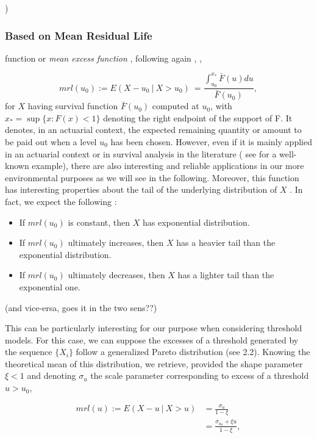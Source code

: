 \documentclass[11pt,a4paper,openany ]{book}
\begin{document}
)

\subsubsection*{Based on Mean Residual Life} function or \emph{mean excess function} 
, following again \cite[pp.14-19]{beirlant_statistics_2006}, \cite[pp.78-80]{coles_introduction_2001},

\begin{equation}
mrl(u_0)
:=E(X-u_0\ |\ X>u_0) 
\ = \frac{\int_{u_0}^{x_*} \bar{F}(u)du}{\bar{F}(u_0)},
\end{equation}
for $X$ having survival function $\bar{F}(u_0)$ computed at $u_0$, with $x_*=\sup\{ x:F(x)<1\}$ denoting the right endpoint of the support of F. 
It denotes, in an actuarial context, the expected remaining quantity or amount to be paid out when a level $u_0$ has been chosen. However, even if it is mainly applied in an actuarial context or in survival analysis in the literature ( see \cite{guess_mean_1988} for a well-known example), there are also interesting and reliable applications in our more environmental purposes as we will see in the following.
Moreover, this function has interesting properties about the tail of the underlying distribution of $X$ \cite[pp.16]{beirlant_statistics_2006}. In fact, we expect the following :

\begin{itemize}
	\item If $mrl(u_0)$ is constant, then $X$ has exponential distribution.
	\item If $mrl(u_0)$ ultimately increases, then $X$ has a heavier tail than the exponential distribution.
	\item If $mrl(u_0)$ ultimately decreases, then $X$ has a lighter tail than the exponential one.
\end{itemize} (and vice-ersa, goes it in the two sens??)

This can be particularly interesting for our purpose when considering threshold models. For this case, we can suppose the excesses of a threshold generated by the sequence $\{X_i\}$ follow a generalized Pareto distribution (see 2.2). Knowing the theoretical mean of this distribution, we retrieve, provided the shape parameter $\xi<1$ and denoting $\sigma_u$ the scale parameter corresponding to excess of a threshold $u>u_0$,

\begin{equation} \label{mrl}
\begin{aligned}
mrl(u):=E(X-u\ |\ X>u)
& = \frac{\sigma_u}{1-\xi} \\
& = \frac{\sigma_{u_0}+\xi u}{1-\xi},
\end{aligned}
\end{equation}
\end{document}
